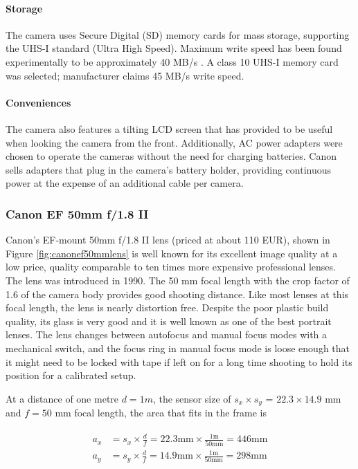\paragraph{Storage}
The camera uses Secure Digital (SD) memory cards for mass storage, supporting the UHS-I standard (Ultra High Speed).
Maximum write speed has been found experimentally to be approximately 40 MB/s \cite{magiclanternforum}.
A class 10 UHS-I memory card was selected; manufacturer claims 45 MB/s write speed.

\paragraph{Conveniences}
The camera also features a tilting LCD screen that has provided to be useful when looking the camera from the front.
Additionally, AC power adapters were chosen to operate the cameras without the need for charging batteries.
Canon sells adapters that plug in the camera's battery holder, providing continuous power at the expense of an additional cable per camera.


\subsubsection{Canon EF 50mm f/1.8 II}

Canon's EF-mount 50mm f/1.8 II lens (priced at about 110 EUR), shown in Figure \ref{fig:canonef50mmlens} is well known for its excellent image quality at a low price, quality comparable to ten times more expensive professional lenses.
The lens was introduced in 1990.
The 50 mm focal length with the crop factor of 1.6 of the camera body provides good shooting distance.
Like most lenses at this focal length, the lens is nearly distortion free.
Despite the poor plastic build quality, its glass is very good and it is well known as one of the best portrait lenses.
The lens changes between autofocus and manual focus modes with a mechanical switch, and the focus ring in manual focus mode is loose enough that it might need to be locked with tape if left on for a long time shooting to hold its position for a calibrated setup.

At a distance of one metre $d = 1 m$, the sensor size of $s_x \times s_y$ = $22.3 \times 14.9$ mm and $f = 50$ mm focal length, the area that fits in the frame is

\begin{align} \label{equ:areasize} \begin{split}
	a_x &= s_x \times \frac{d}{f} = 22.3 \text{mm} \times \frac{1 \text{m}}{50 \text{mm}} = 446 \text{mm}\\
	a_y &= s_y \times \frac{d}{f} = 14.9 \text{mm} \times \frac{1 \text{m}}{50 \text{mm}} = 298 \text{mm}
\end{split} \end{align}

